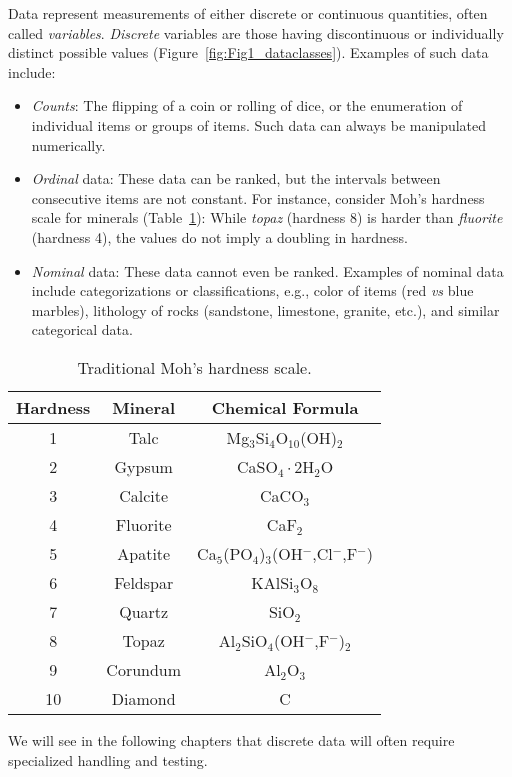 Data represent measurements of either discrete or continuous quantities, often called \emph{variables}.  
\emph{Discrete} variables are those having discontinuous or individually distinct possible values (Figure~\ref{fig:Fig1_dataclasses}).  
Examples of such data include:
\begin{itemize}
\item 	\emph{Counts}: The flipping of a coin or rolling of dice, or the enumeration of individual items or groups of items.
	Such data can always be manipulated numerically.
\item	\emph{Ordinal} data: These data can be ranked, but the intervals between consecutive items are not constant.
  For instance, consider Moh's hardness scale for minerals (Table~\ref{tbl:Moh}): While \emph{topaz}
(hardness 8) is harder than \emph{fluorite} (hardness 4), the values do not imply a doubling in hardness.
\item	\emph{Nominal} data: These data cannot even be ranked.  Examples of nominal data include categorizations or classifications,
e.g., color of items (red \emph{vs} blue marbles), lithology of rocks (sandstone, limestone, granite, etc.), and similar categorical data.
\end{itemize}
\begin{table}[h]
\centering
\begin{tabular}{|c|c|c|} \hline
\bf{Hardness} & \bf{Mineral} &  \bf{Chemical Formula} \\ \hline
 1 &  Talc      &    Mg$_3$Si$_4$O$_{10}$(OH)$_2$     \\
 2 &  Gypsum    &    CaSO$_4\cdot$2H$_2$O      \\
 3 &  Calcite   &    CaCO$_3$     \\
 4 &  Fluorite  &    CaF$_2$     \\
 5 &  Apatite   &    Ca$_5$(PO$_4$)$_3$(OH$^-$,Cl$^-$,F$^-$)      \\
 6 &  Feldspar  &    KAlSi$_3$O$_8$     \\
 7 &  Quartz    &    SiO$_2$       \\
 8 &  Topaz     &    Al$_2$SiO$_4$(OH$^-$,F$^-$)$_2$     \\
 9 &  Corundum  &    Al$_2$O$_3$      \\
 10 &  Diamond  &        C       \\ \hline
\end{tabular}
\caption{Traditional Moh's hardness scale.}
\label{tbl:Moh}
\end{table}
We will see in the following chapters that discrete data will often require specialized handling and testing.

